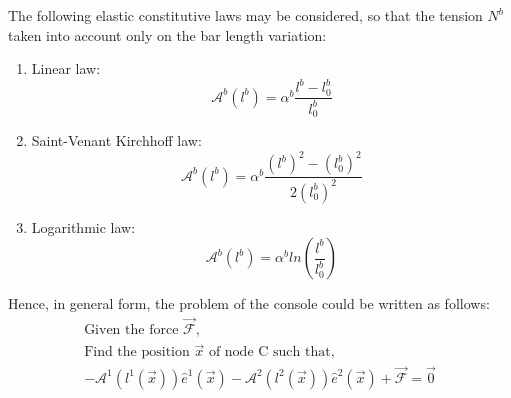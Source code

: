 \documentclass[a4paper,12pt]{article}
\numberwithin{equation}{section}
\theoremstyle{remark}
\begin{document}
The following elastic constitutive laws may be considered, so that the tension $N^b$ taken into account only on the bar length variation:
\begin{enumerate}[label=-]
  \item Linear law:   \begin{equation}
    \mathcal{A}^b (l^b) = \alpha^b \dfrac{l^b - l^b_0}{l^b_0}
    \label{linearLaw}
  \end{equation}
  \item Saint-Venant Kirchhoff law:
  \begin{equation}
    \mathcal{A}^b (l^b) = \alpha^b \dfrac{(l^b)^2 - (l^b_0)^2}{2 (l^b_0)^2}
    \label{kirchhoffLaw}
  \end{equation}
  \item Logarithmic law:
\begin{equation}
    \mathcal{A}^b (l^b) = \alpha^b ln(\dfrac{l^b}{l^b_0})
    \label{logarithmicLaw}
  \end{equation}
\end{enumerate}
Hence, in general form, the problem of the console could be written as follows:
  \begin{align}
    \text{Given the force } \vec{\mathcal{F}}, \nonumber\\
    \text{Find the position } \vec{x} \text{ of node C such that,} \nonumber\\
      -\mathcal{A}^1 (l^1(\vec{x})) \hat{e}^1(\vec{x}) -  \mathcal{A}^2 (l^2(\vec{x})) \hat{e}^2(\vec{x}) + \vec{\mathcal{F}} = \vec{0}
  \label{nodeEquilibrium2D}
 \end{align}
\end{document}
